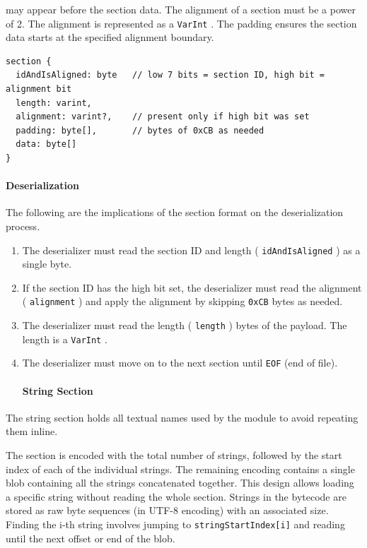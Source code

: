 \documentclass{article}
\begin{document}
may appear before the section data. The alignment of a section must be a power of 2. The alignment is represented as a \texttt{VarInt} . The padding ensures the section data starts at the specified alignment boundary.


\begin{lstlisting}
section {
  idAndIsAligned: byte   // low 7 bits = section ID, high bit = alignment bit
  length: varint,
  alignment: varint?,    // present only if high bit was set
  padding: byte[],       // bytes of 0xCB as needed
  data: byte[]
}
\end{lstlisting}

\paragraph{Deserialization}

The following are the implications of the section format on the deserialization process.


\begin{enumerate}
\item The deserializer must read the section ID and length ( \texttt{idAndIsAligned} ) as a single byte.
\item If the section ID has the high bit set, the deserializer must read the alignment ( \texttt{alignment} ) and apply the alignment by skipping \texttt{0xCB} bytes as needed.
\item The deserializer must read the length ( \texttt{length} ) bytes of the payload. The length is a \texttt{VarInt} .
\item The deserializer must move on to the next section until \texttt{EOF} (end of file).


\paragraph{String Section}

\end{enumerate}
The string section holds all textual names used by the module to avoid repeating them inline.

The section is encoded with the total number of strings, followed by the start index of each of the individual strings. The remaining encoding contains a single blob containing all the strings concatenated together. This design allows loading a specific string without reading the whole section. Strings in the bytecode are stored as raw byte sequences (in UTF-8 encoding) with an associated size. Finding the i-th string involves jumping to \texttt{stringStartIndex[i]} and reading until the next offset or end of the blob.
\end{document}

